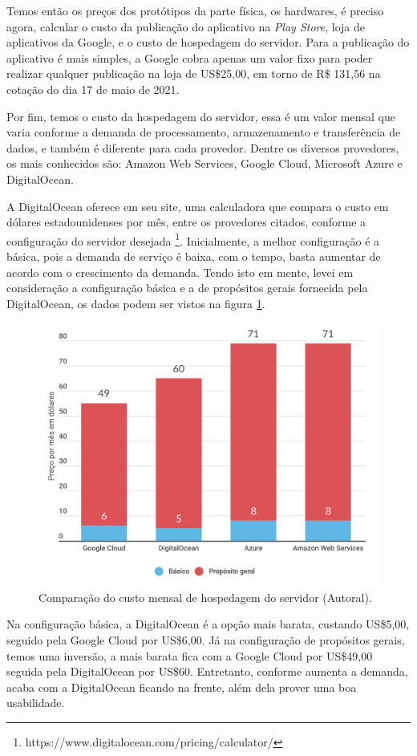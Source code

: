 Temos então os preços dos protótipos da parte física, os hardwares, é preciso agora, calcular o custo da publicação do aplicativo na \textit{Play Store}, loja de aplicativos da Google, e o custo de hospedagem do servidor. Para a publicação do aplicativo é mais simples, a Google cobra apenas um valor fixo para poder realizar qualquer publicação na loja de US\$25,00, em torno de R\$ 131,56 na cotação do dia 17 de maio de 2021.

Por fim, temos o custo da hospedagem do servidor, essa é um valor mensal que varia conforme a demanda de processamento, armazenamento e transferência de dados, e também é diferente para cada provedor. Dentre os diversos provedores, os mais conhecidos são: Amazon Web Services, Google Cloud, Microsoft Azure e DigitalOcean.

A DigitalOcean oferece em seu site, uma calculadora que compara o custo em dólares estadounidenses por mês, entre os provedores citados, conforme a configuração do servidor desejada \footnote{https://www.digitalocean.com/pricing/calculator/}. Inicialmente, a melhor configuração é a básica, pois a demanda de serviço é baixa, com o tempo, basta aumentar de acordo com o crescimento da demanda. Tendo isto em mente, levei em consideração a configuração básica e a de propósitos gerais fornecida pela DigitalOcean, os dados podem ser vistos na figura \ref{fig:server-chart}.

\begin{figure}[H]
  \centering
  \includegraphics[width=.80\textwidth]{assets/server-chart.png} 
  \caption{Comparação do custo mensal de hospedagem do servidor (Autoral).}
  \label{fig:server-chart} 
\end{figure}

Na configuração básica, a DigitalOcean é a opção mais barata, custando US\$5,00, seguido pela Google Cloud por US\$6,00. Já na configuração de propósitos gerais, temos uma inversão, a mais barata fica com a Google Cloud por US\$49,00 seguida pela DigitalOcean por US\$60. Entretanto, conforme aumenta a demanda, acaba com a DigitalOcean ficando na frente, além dela prover uma boa usabilidade.